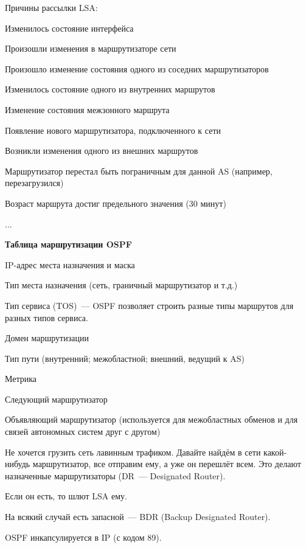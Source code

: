 Причины рассылки LSA:
\begin{MyItemize}
    \item Изменилось состояние интерфейса
    \item Произошли изменения в маршрутизаторе сети
    \item Произошло изменение состояния одного из соседних маршрутизаторов
    \item Изменилось состояние одного из внутренних маршрутов
    \item Изменение состояния межзонного маршрута
    \item Появление нового маршрутизатора, подключенного к сети
    \item Возникли изменения одного из внешних маршрутов
    \item Маршрутизатор перестал быть пограничным для данной AS (например, перезагрузился)
    \item Возраст маршрута достиг предельного значения (30 минут)
    \item ...
\end{MyItemize}

{\bf Таблица маршрутизации OSPF}
\begin{MyItemize}
    \item IP-адрес места назначения и маска
    \item Тип места назначения (сеть, граничный маршрутизатор и т.д.)
    \item Тип сервиса (TOS)~--- OSPF позволяет строить разные типы маршрутов для разных типов сервиса. 
    \item Домен маршрутизации
    \item Тип пути (внутренний; межобластной; внешний, ведущий к AS)
    \item Метрика
    \item Следующий маршрутизатор
    \item Объявляющий маршрутизатор (используется для межобластных обменов и для связей автономных систем друг с другом)
\end{MyItemize}

Не хочется грузить сеть лавинным трафиком. Давайте найдём в сети какой-нибудь маршрутизатор, все отправим ему, а уже он перешлёт всем. Это делают назначенные маршрутизаторы (DR~--- Designated Router).

Если он есть, то шлют LSA ему.

На всякий случай есть запасной~--- BDR (Backup Designated Router).

OSPF инкапсулируется в IP (с кодом 89).

